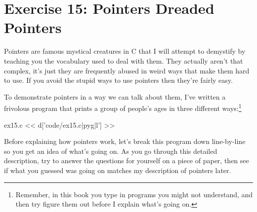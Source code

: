 \chapter{Exercise 15: Pointers Dreaded Pointers}

Pointers are famous mystical creatures in C that I will attempt to
demystify by teaching you the vocabulary used to deal with them.  They
actually aren't that complex, it's just they are frequently abused
in weird ways that make them hard to use.  If you avoid the stupid
ways to use pointers then they're fairly easy.

To demonstrate pointers in a way we can talk about them, I've
written a frivolous program that prints a group of people's
ages in three different ways:\footnote{Remember, in this book you type
in programs you might not understand, and then try figure them
out before I explain what's going on.}

\begin{code}{ex15.c}
<< d['code/ex15.c|pyg|l'] >>
\end{code}

Before explaining how pointers work, let's break this program down
line-by-line so you get an idea of what's going on.  As you go
through this detailed description, try to answer the questions for 
yourself on a piece of paper, then see if what you guessed was
going on matches my description of pointers later.

